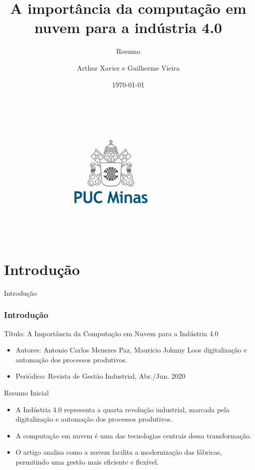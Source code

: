 \documentclass[serif, aspectratio=169]{beamer}
\author{Arthur Xavier e Guilherme Vieira}
\title{A importância da computação em nuvem
para a indústria 4.0}
\subtitle{Resumo}
\institute{
    
    
    Pontifícia Universidade Católica de Minas Gerais - Coração Eucarístico \\
}
\date{\small \today}
\begin{document}
\begin{frame}
    \titlepage
    \vspace*{-0.6cm}
    \begin{figure}[htpb]
        \begin{center}
            \includegraphics[keepaspectratio, scale=0.2]{pic/imagem_2024-09-20_151003486.png}
        \end{center}
    \end{figure}
\end{frame}

\begin{frame}    
\tableofcontents[sectionstyle=show,
subsectionstyle=show/shaded/hide,
subsubsectionstyle=show/shaded/hide]
\end{frame}


\section{Introdução}
\begin{frame}{Introdução}
	\frametitle<presentation>{Introdução}
	\begin{block}{Título: A Importância da Computação em Nuvem para a Indústria 4.0}
		\begin{itemize}
			\item Autores: Antonio Carlos Menezes Paz, Mauricio Johnny Loos digitalização e automação dos processos produtivos.
			\item Periódico: Revista de Gestão Industrial, Abr./Jun. 2020

		\end{itemize}
	\end{block}
	\begin{block}{Resumo Inicial}
		\begin{itemize}
			\item A Indústria 4.0 representa a quarta revolução industrial, marcada pela digitalização e automação dos processos produtivos.
			\item A computação em nuvem é uma das tecnologias centrais dessa transformação.

			\item O artigo analisa como a nuvem facilita a modernização das fábricas, permitindo uma gestão mais eficiente e flexível.

		\end{itemize}
	\end{block}
\end{frame}
\end{document}
